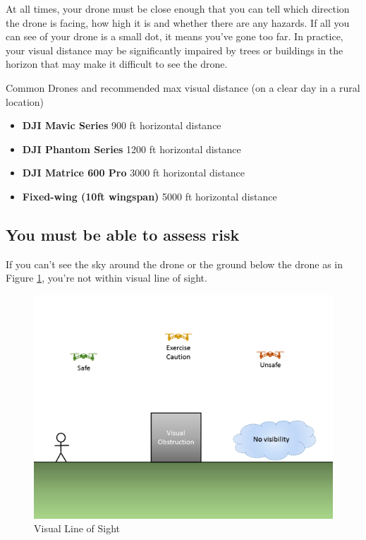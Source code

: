 \documentclass[
]{book}
\providecommand{\tightlist}{%
  \setlength{\itemsep}{0pt}\setlength{\parskip}{0pt}}
\begin{document}
At all times, your drone must be close enough that you can tell which direction the drone is facing, how high it is and whether there are any hazards. If all you can see of your drone is a small dot, it means you've gone too far. In practice, your visual distance may be significantly impaired by trees or buildings in the horizon that may make it difficult to see the drone.

Common Drones and recommended max visual distance (on a clear day in a rural location)

\begin{itemize}
\tightlist
\item
  \textbf{DJI Mavic Series} 900 ft horizontal distance
\item
  \textbf{DJI Phantom Series} 1200 ft horizontal distance
\item
  \textbf{DJI Matrice 600 Pro} 3000 ft horizontal distance
\item
  \textbf{Fixed-wing (10ft wingspan)} 5000 ft horizontal distance
\end{itemize}

\hypertarget{you-must-be-able-to-assess-risk}{%
\subsection{You must be able to assess risk}\label{you-must-be-able-to-assess-risk}}

If you can't see the sky around the drone or the ground below the drone as in Figure \ref{fig:vlos}, you're not within visual line of sight.

\begin{figure}

{\centering \includegraphics[width=0.8\linewidth]{images/VLOS_G} 

}

\caption{Visual Line of Sight}\label{fig:vlos}
\end{figure}
\end{document}
